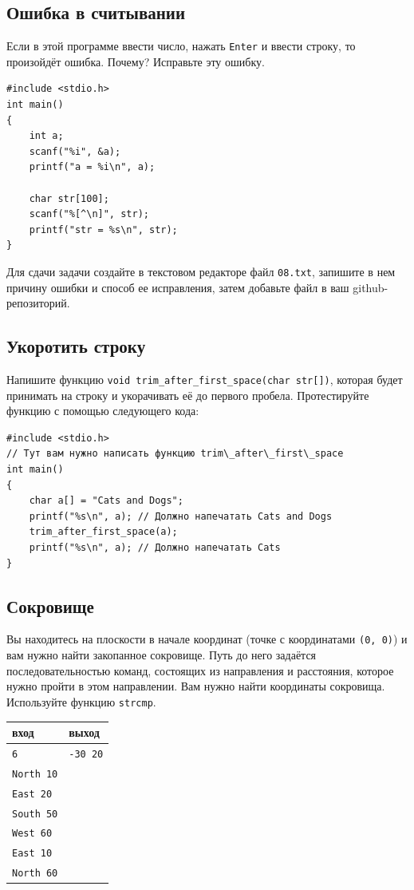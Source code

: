 \documentclass[10pt]{article}
\begin{document}
\subsection{Ошибка в считывании}
Если в этой программе ввести число, нажать \texttt{Enter} и ввести строку, то произойдёт ошибка. Почему? Исправьте эту ошибку.
\begin{lstlisting}
#include <stdio.h>
int main()
{
    int a;
    scanf("%i", &a);
    printf("a = %i\n", a);

    char str[100];
    scanf("%[^\n]", str);
    printf("str = %s\n", str);
}
\end{lstlisting}
Для сдачи задачи создайте в текстовом редакторе файл \texttt{08.txt}, запишите в нем причину ошибки и способ ее исправления, затем добавьте файл в ваш github-репозиторий.


\subsection{Укоротить строку}
Напишите функцию \texttt{void trim\_after\_first\_space(char str[])}, которая будет принимать на строку и укорачивать её до первого пробела. Протестируйте функцию с помощью следующего кода:
\begin{lstlisting}
#include <stdio.h>
// Тут вам нужно написать функцию trim\_after\_first\_space
int main() 
{
    char a[] = "Cats and Dogs";
    printf("%s\n", a); // Должно напечатать Cats and Dogs
    trim_after_first_space(a);
    printf("%s\n", a); // Должно напечатать Cats
}
\end{lstlisting}


\subsection{Сокровище}
Вы находитесь на плоскости в начале координат (точке с координатами \texttt{(0, 0)}) и вам нужно найти закопанное сокровище. Путь до него задаётся последовательностью команд, состоящих из направления и расстояния, которое нужно пройти в этом направлении. Вам нужно найти координаты сокровища. Используйте функцию \texttt{strcmp}.
\begin{center} 
\begin{tabular}{ l | l }
 вход & выход \\ \hline
 \texttt{6} & \texttt{-30 20}\\
 \texttt{North 10} & \\
 \texttt{East 20} &\\
 \texttt{South 50} &\\
 \texttt{West 60} &\\
 \texttt{East 10} &\\
 \texttt{North 60} &\\
\end{tabular}
\end{center}
\end{document}
